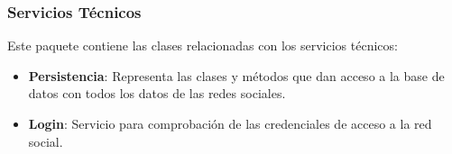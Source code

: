 \documentclass[12pt, a4paper, titlepage]{article}
\begin{document}
\subsubsection{Servicios Técnicos}

Este paquete contiene las clases relacionadas con los servicios técnicos:
\begin{itemize}
	\item \textbf{Persistencia}: Representa las clases y métodos que dan acceso a la base de datos con todos los datos de las redes sociales.
	\item \textbf{Login}: Servicio para comprobación de las credenciales de acceso a la red social.
\end{itemize}
\end{document}
